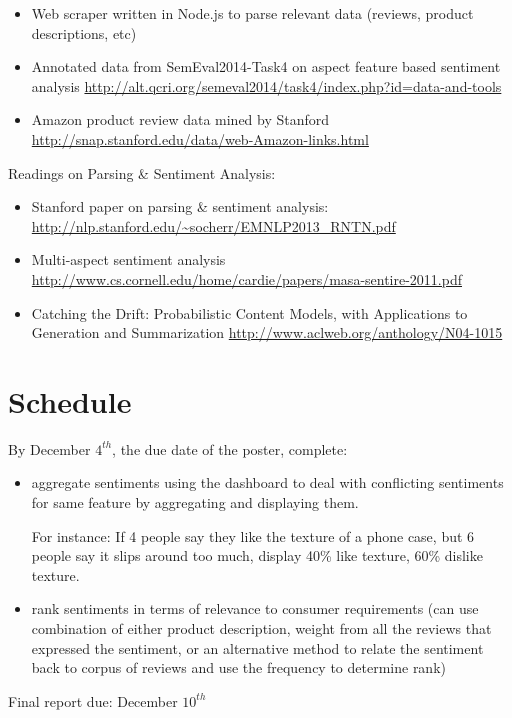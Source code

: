 \documentclass{article}
\begin{document}
\begin{itemize}
\item Web scraper written in Node.js to parse relevant data (reviews, product descriptions, etc)
\newline 

\item Annotated data from SemEval2014-Task4 on aspect feature based sentiment analysis
\newline
\url{http://alt.qcri.org/semeval2014/task4/index.php?id=data-and-tools}

\item Amazon product review data mined by Stanford
\newline
\url{http://snap.stanford.edu/data/web-Amazon-links.html}
\end{itemize}

Readings on Parsing \& Sentiment Analysis:
\begin{itemize}
\item Stanford paper on parsing \& sentiment analysis:
\newline
\url{http://nlp.stanford.edu/~socherr/EMNLP2013_RNTN.pdf}

\item Multi-aspect sentiment analysis
\newline 
\url{http://www.cs.cornell.edu/home/cardie/papers/masa-sentire-2011.pdf}

\item Catching the Drift: Probabilistic Content Models, with Applications to
Generation and Summarization \newline
\url{http://www.aclweb.org/anthology/N04-1015}
\end{itemize}

\section{Schedule}

By December $4^{th}$, the due date of the poster, complete:
\begin{itemize}
\item aggregate sentiments using the dashboard to deal with conflicting sentiments for same feature by aggregating and displaying them. 

For instance: If 4 people say they like the texture of a phone case, but 6 people say it slips around too much, display 40\% like texture, 60\% dislike texture. 

\item 
rank sentiments in terms of relevance to consumer requirements (can use combination of either product description, weight from all the reviews that expressed the sentiment, or an alternative method to relate the sentiment back to corpus of reviews and use the frequency to determine rank)

\end{itemize}

Final report due: December $10^{th}$
\end{document}
